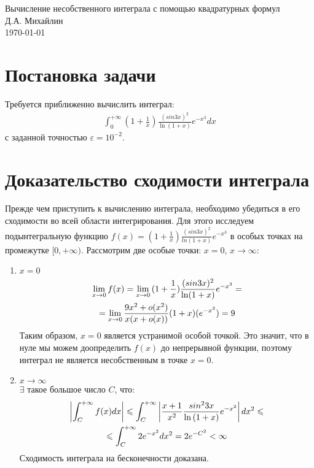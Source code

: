 \documentclass[titlepage]{article}
\def\l{\left}
\def\r{\right}
\def\le{\leqslant}
\begin{document}
 

\newtheorem{theorem}{Теорема}
\newtheorem{lemma}{Лемма}
\newtheorem{definition}{Определение}
\renewcommand{\proofname}{Доказательство}

\begin{center}
\hfill \break
\hfill \break
\hfill \break
\LARGE Вычисление несобственного интеграла с помощью квадратурных формул \\
\hfill \break
\large Д.А. Михайлин \\
\hfill \break
\today \\

\end{center}

\section{Постановка задачи}
Требуется приближенно вычислить интеграл: 
\begin{gather}
	\int_{0}^{+\infty}(1 + \frac{1}{x})\frac{(sin{3x})^2}{\ln(1 + x)}e^{-x^3}dx
\end{gather}
с заданной точностью $\varepsilon = 10^{-2}$.

\section{Доказательство сходимости интеграла}
Прежде чем приступить к вычислению интеграла, необходимо убедиться в его сходимости во всей области интегрирования. Для этого исследуем подынтегральную функцию $f(x) = (1 + \frac{1}{x})\frac{(sin{3x})^2}{ln(1 + x)}e^{-x^3}$ в особых точках на промежутке $[0, +\infty)$. Рассмотрим две особые точки: $x = 0$,  $x \to \infty$:

\begin{enumerate}
	\item $x = 0$ \\
	\begin{gather}
		\notag \lim_{x \to 0}{f(x)} = \lim_{x \to 0}{(1 + \frac{1}{x})\frac{(sin{3x})^2}{\ln(1 + x)}e^{-x^3}} = \\
		\notag = \lim_{x \to 0}{\frac{9x^2 + o(x^2)}{x(x + o(x))}(1 + x)(e^{-x^2})} = 9
	\end{gather}
	Таким образом, $x = 0$ является устранимой особой точкой. Это значит, что в нуле мы можем доопределить $f(x)$ до непрерывной функции, поэтому интеграл не является несобственным в точке $x = 0$.
\item $x \to \infty$ \\
	
	$\exists$ такое большое число $C$, что:
	\begin{gather}
		\notag \l| \int_{C}^{+\infty}{f(x)dx} \r| \le \int_{C}^{+\infty}{\l| \frac{x + 1}{x^2}\frac{sin^2{3x}}{\ln{(1+x)}}e^{-x^2}\r|dx^2} \le \\ \notag \le\int_{C}^{+\infty}{ 2e^{-x^3} dx^2} = 2e^{-C^2} < \infty
	\end{gather}
Сходимость интеграла на бесконечности доказана.
\end{enumerate}
\end{document}
